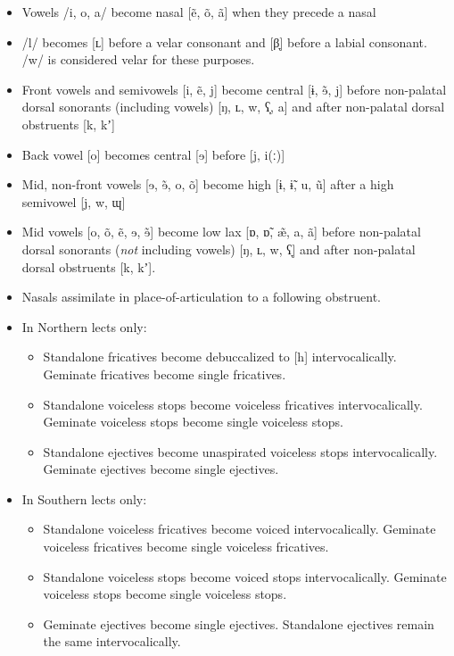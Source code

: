 \documentclass[a4paper,11pt,oneside,openany]{memoir}
\newcommand{\bripa}[1]{[#1]}
\newcommand{\phipa}[1]{/#1/}
\newcommand{\bilav}{β}
\newcommand{\engma}{ŋ}
\newcommand{\vell}{ʟ}
\newcommand{\velprox}{ɰ}
\newcommand{\pharox}{ʕ}
\newcommand{\bari}{ɨ}
\newcommand{\sche}{ɘ}
\newcommand{\aesh}{æ}
\newcommand{\ahoh}{ɒ}
\newcommand{\jekt}{ʼ}
\newcommand{\nav}{̃}
\newcommand{\dwnwrd}{̞}
\newcommand{\lgth}{ː}
\begin{document}
\begin{itemize}
    \item Vowels \phipa{i, o, a} become nasal \bripa{e\nav, o\nav, a\nav} when they precede a nasal
    \item \phipa{l} becomes \bripa{\vell} before a velar consonant and \bripa{\bilav\dwnwrd} before a labial consonant. \phipa{w} is considered velar for these purposes.
    \item Front vowels and semivowels \bripa{i, e\nav, j} become central \bripa{\bari, \sche\nav, j} before non-palatal dorsal sonorants (including vowels) \bripa{\engma, \vell, w, \pharox\dwnwrd, a} and after non-palatal dorsal obstruents \bripa{k, k\jekt}
    \item Back vowel \bripa{o} becomes central \bripa{\sche} before \bripa{j, i(\lgth)}
    \item Mid, non-front vowels \bripa{\sche, \sche\nav, o, o\nav} become high \bripa{\bari, \bari\nav, u, u\nav} after a high semivowel \bripa{j, w, \velprox}
    \item Mid vowels \bripa{o, o\nav, e\nav, \sche, \sche\nav} become low lax \bripa{\ahoh, \ahoh\nav, \aesh\nav, a, a\nav} before non-palatal dorsal sonorants (\emph{not} including vowels) \bripa{\engma, \vell, w, \pharox\dwnwrd} and after non-palatal dorsal obstruents \bripa{k, k\jekt}.
    \item Nasals assimilate in place-of-articulation to a following obstruent.
    \item In Northern lects only:
    \begin{itemize}
        \item Standalone fricatives become debuccalized to \bripa{h} intervocalically. Geminate fricatives become single fricatives.
        \item Standalone voiceless stops become voiceless fricatives intervocalically. Geminate voiceless stops become single voiceless stops.
        \item Standalone ejectives become unaspirated voiceless stops intervocalically. Geminate ejectives become single ejectives.
    \end{itemize}
    \item In Southern lects only:
    \begin{itemize}
        \item Standalone voiceless fricatives become voiced intervocalically. Geminate voiceless fricatives become single voiceless fricatives.
        \item Standalone voiceless stops become voiced stops intervocalically. Geminate voiceless stops become single voiceless stops.
        \item Geminate ejectives become single ejectives. Standalone ejectives remain the same intervocalically.
    \end{itemize}
\end{itemize}
\end{document}
